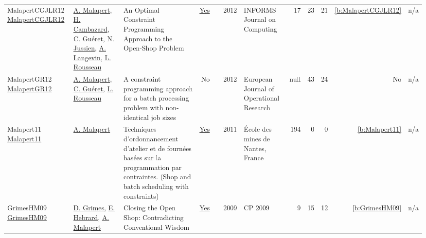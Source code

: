 {\begin{longtable}{>{\raggedright\arraybackslash}p{3cm}>{\raggedright\arraybackslash}p{6cm}>{\raggedright\arraybackslash}p{6.5cm}rrrp{2.5cm}rrrrr}
MalapertCGJLR12 \href{https://doi.org/10.1287/ijoc.1100.0446}{MalapertCGJLR12} & \hyperref[auth:a82]{A. Malapert}, \hyperref[auth:a1011]{H. Cambazard}, \hyperref[auth:a295]{C. Gu{\'{e}}ret}, \hyperref[auth:a249]{N. Jussien}, \hyperref[auth:a651]{A. Langevin}, \hyperref[auth:a329]{L. Rousseau} & An Optimal Constraint Programming Approach to the Open-Shop Problem & \href{../works/MalapertCGJLR12.pdf}{Yes} & \cite{MalapertCGJLR12} & 2012 & INFORMS Journal on Computing & 17 & 23 & 21 & \ref{b:MalapertCGJLR12} & n/a\\
MalapertGR12 \href{http://dx.doi.org/10.1016/j.ejor.2012.04.008}{MalapertGR12} & \hyperref[auth:a82]{A. Malapert}, \hyperref[auth:a1400]{C. Guéret}, \hyperref[auth:a1401]{L. Rousseau} & A constraint programming approach for a batch processing problem with non-identical job sizes & No & \cite{MalapertGR12} & 2012 & European Journal of Operational Research & null & 43 & 24 & No & n/a\\
Malapert11 \href{https://tel.archives-ouvertes.fr/tel-00630122}{Malapert11} & \hyperref[auth:a82]{A. Malapert} & Techniques d'ordonnancement d'atelier et de fourn{\'{e}}es bas{\'{e}}es sur la programmation par contraintes. (Shop and batch scheduling with constraints) & \href{../works/Malapert11.pdf}{Yes} & \cite{Malapert11} & 2011 & {\'{E}}cole des mines de Nantes, France & 194 & 0 & 0 & \ref{b:Malapert11} & n/a\\
GrimesHM09 \href{https://doi.org/10.1007/978-3-642-04244-7_33}{GrimesHM09} & \hyperref[auth:a182]{D. Grimes}, \hyperref[auth:a1]{E. Hebrard}, \hyperref[auth:a82]{A. Malapert} & Closing the Open Shop: Contradicting Conventional Wisdom & \href{../works/GrimesHM09.pdf}{Yes} & \cite{GrimesHM09} & 2009 & CP 2009 & 9 & 15 & 12 & \ref{b:GrimesHM09} & n/a\\
\end{longtable}
}

\clearpage
